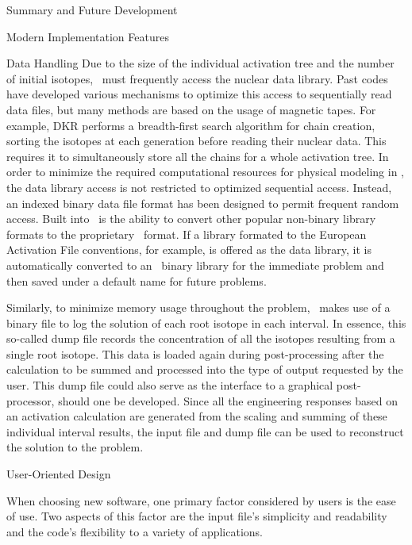 \begin{chapter}{Summary and Future Development}
\begin{section}{Modern Implementation Features\label{sec:summary.modern}}
    \begin{subsection}{Data Handling}
      Due to the size of the individual activation tree and the number
      of initial isotopes, \ALARA\  must frequently access the nuclear
      data library.  Past codes have developed various mechanisms to
      optimize this access to sequentially read data files, but many
      methods are based on the usage of magnetic tapes.  For example,
      DKR performs a breadth-first search algorithm for chain
      creation, sorting the isotopes at each generation before reading
      their nuclear data.  This requires it to simultaneously store
      all the chains for a whole activation tree.  In order to
      minimize the required computational resources for physical
      modeling in \ALARA, the data library access is not restricted
      to optimized sequential access.  Instead, an indexed binary data
      file format has been designed to permit frequent random access.
      Built into \ALARA\   is the ability to convert other popular
      non-binary library formats to the proprietary \ALARA\  format.
      If a library formated to the European Activation File\cite{EAF}
      conventions, for example, is offered as the data library, it is
      automatically converted to an \ALARA\  binary library for the
      immediate problem and then saved under a default name for future
      problems.
      
      Similarly, to minimize memory usage throughout the problem,
      \ALARA\ makes use of a binary file to log the solution of each
      root isotope in each interval.  In essence, this so-called dump
      file records the concentration of all the isotopes resulting
      from a single root isotope.  This data is loaded again during
      post-processing after the calculation to be summed and processed
      into the type of output requested by the user.  This dump file
      could also serve as the interface to a graphical post-processor,
      should one be developed.  Since all the engineering responses
      based on an activation calculation are generated from the
      scaling and summing of these individual interval results, the
      input file and dump file can be used to reconstruct the solution
      to the problem.
    \end{subsection}
    
    \begin{subsection}{User-Oriented Design}
      
      When choosing new software, one primary factor considered by
      users is the ease of use.  Two aspects of this factor are the
      input file's simplicity and readability and the code's
      flexibility to a variety of applications.
      

\end{subsection}
\end{section}
\end{chapter}
